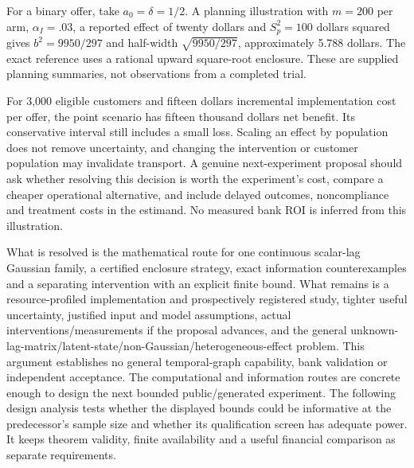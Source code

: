For a binary offer, take \(a_0=\delta=1/2\). A planning illustration
with \(m=200\) per arm, \(\alpha_I=.03\), a reported effect of twenty
dollars and \(S_p^2=100\) dollars squared gives \(b^2=9950/297\) and
half-width \(\sqrt{9950/297}\), approximately 5.788 dollars. The exact
reference uses a rational upward square-root enclosure. These are
supplied planning summaries, not observations from a completed trial.

For 3,000 eligible customers and fifteen dollars incremental
implementation cost per offer, the point scenario has fifteen thousand
dollars net benefit. Its conservative interval still includes a small
loss. Scaling an effect by population does not remove uncertainty, and
changing the intervention or customer population may invalidate
transport. A genuine next-experiment proposal should ask whether
resolving this decision is worth the experiment's cost, compare a
cheaper operational alternative, and include delayed outcomes,
noncompliance and treatment costs in the estimand. No measured bank ROI
is inferred from this illustration.

What is resolved is the mathematical route for one continuous scalar-lag
Gaussian family, a certified enclosure strategy, exact information
counterexamples and a separating intervention with an explicit finite
bound. What remains is a resource-profiled implementation and
prospectively registered study, tighter useful uncertainty, justified
input and model assumptions, actual interventions/measurements if the
proposal advances, and the general
unknown-lag-matrix/latent-state/non-Gaussian/heterogeneous-effect
problem. This argument establishes no general temporal-graph capability,
bank validation or independent acceptance. The computational and
information routes are concrete enough to design the next bounded
public/generated experiment. The following design analysis tests whether the displayed bounds could be informative at the predecessor's sample size and whether its qualification screen has adequate power. It keeps theorem validity, finite availability and a useful financial comparison as separate requirements.

\label{exec13:temporal-region-end}
